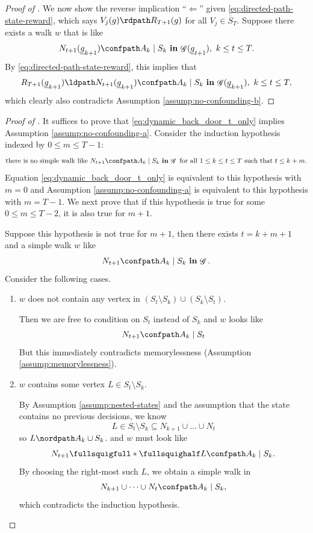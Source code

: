 \documentclass[12pt,a4paper]{article}
\theoremstyle{definition}
\newcommand{\ingraph}[1]{~\textnormal{\bf in}\,#1}
\DeclareMathOperator{\gG}{\mathscr{G}}
\begin{document}
\begin{proof}[Proof of ]
  We now show the reverse implication ``$\Leftarrow$'' given
  \eqref{eq:directed-path-state-reward}, which says
  $V_j(g) \rdpath R_{T+1}(g)$ for all $V_j \in
  \overline{S}_T$. Suppose there exists a walk $w$ that is like
  \[
      N_{t+1}(\underline{g}_{k+1}) \confpath A_k \mid S_k \ingraph{\gG(\underline{g}_{t+1})}, ~ k\leq t\leq T.
  \]
  By \eqref{eq:directed-path-state-reward}, this implies that
  \[
      R_{T+1}(\underline{g}_{k+1}) \ldpath N_{t+1}(\underline{g}_{k+1}) \confpath A_k \mid S_k \ingraph{\gG(\underline{g}_{k+1})}, ~ k\leq t \leq T,
  \]
  which clearly also contradicts Assumption \ref{assump:no-confounding-b}.
\end{proof}

\begin{proof}[Proof of ]
  It suffices to prove that \eqref{eq:dynamic_back_door_t_only}
  implies Assumption \ref{assump:no-confounding-a}.
  Consider the induction hypothesis indexed by $0 \leq m \leq T-1$:
  \[
      \text{there is no simple walk like}~N_{t+1} \confpath A_k \mid S_k \ingraph{\gG}~\text{for
        all}~1 \leq k \leq t \leq T~\text{such that}~t \leq k + m.
    \]
  Equation \eqref{eq:dynamic_back_door_t_only} is equivalent to this
  hypothesis with $m = 0$ and Assumption \ref{assump:no-confounding-a}
  is equivalent to this hypothesis with $m = T-1$. We next prove that if
  this hypothesis is true for some $0 \leq m \leq T-2$, it is also true for
  $m + 1$.

  Suppose this hypothesis is not true for $m+1$, then there exists $t
  = k + m + 1$ and a simple walk $w$ like
  \[
      N_{t+1} \confpath A_k \mid S_k \ingraph{\gG}.
  \]
  Consider the following cases.
  \begin{enumerate}
    \item $w$ does not contain any vertex in $(S_t \setminus S_k) \cup (S_k \setminus S_t)$.

    Then we are free to condition on $S_t$ instead of $S_k$ and $w$ looks like
    \[
        N_{t+1} \confpath A_k \mid S_{t}
    \]
    But this immediately contradicts memorylessness (Assumption
    \ref{assump:memorylessness}).

  \item $w$ contains some vertex $L \in S_t \setminus S_k$.

    By Assumption \ref{assump:nested-states} and the assumption that
    the state contains no previous decisions, we know
    \[L \in S_t \setminus S_k
      \subseteq N_{k+1} \cup \dots \cup N_t
    \]
    so $L \nordpath A_k \cup S_k$. %
    and $w$ must look like
    \[
        N_{t+1} \fullsquigfull \ast \fullsquighalf L \confpath A_k
        \mid S_k.
    \]
    By choosing the right-most such $L$, we obtain a simple walk in
    \[
        N_{k+1} \cup \dots \cup N_t \confpath A_k \mid S_k,
    \]
    which contradicts the induction hypothesis.


\end{enumerate}
\end{proof}
\end{document}
